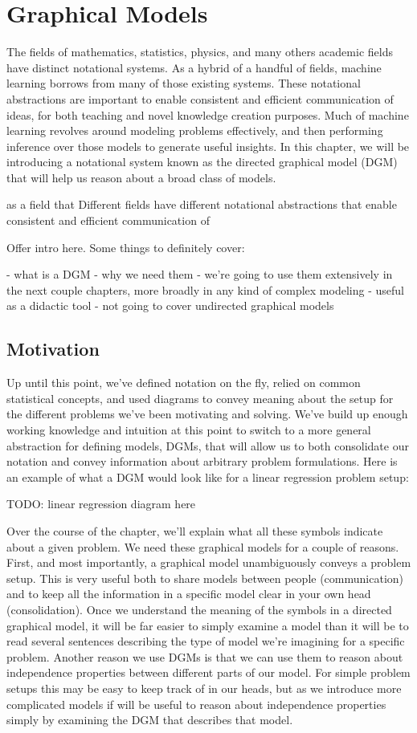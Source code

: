 \chapter{Graphical Models}
The fields of mathematics, statistics, physics, and many others academic fields have distinct notational systems. As a hybrid of a handful of fields, machine learning borrows from many of those existing systems. These notational abstractions are important to enable consistent and efficient communication of ideas, for both teaching and novel knowledge creation purposes. Much of machine learning revolves around modeling problems effectively, and then performing inference over those models to generate useful insights. In this chapter, we will be introducing a notational system known as the directed graphical model (DGM) that will help us reason about a broad class of models.

 as a field that Different fields have different notational abstractions that enable consistent and efficient communication of 

Offer intro here. Some things to definitely cover:

- what is a DGM
- why we need them
- we're going to use them extensively in the next couple chapters, more broadly in any kind of complex modeling
- useful as a didactic tool
- not going to cover undirected graphical models

\section{Motivation}
Up until this point, we've defined notation on the fly, relied on common statistical concepts, and used diagrams to convey meaning about the setup for the different problems we've been motivating and solving. We've build up enough working knowledge and intuition at this point to switch to a more general abstraction for defining models, DGMs, that will allow us to both consolidate our notation and convey information about arbitrary problem formulations. Here is an example of what a DGM would look like for a linear regression problem setup:

TODO: linear regression diagram here

Over the course of the chapter, we'll explain what all these symbols indicate about a given problem. We need these graphical models for a couple of reasons. First, and most importantly, a graphical model unambiguously conveys a problem setup. This is very useful both to share models between people (communication) and to keep all the information in a specific model clear in your own head (consolidation). Once we understand the meaning of the symbols in a directed graphical model, it will be far easier to simply examine a model than it will be to read several sentences describing the type of model we're imagining for a specific problem. Another reason we use DGMs is that we can use them to reason about independence properties between different parts of our model. For simple problem setups this may be easy to keep track of in our heads, but as we introduce more complicated models if will be useful to reason about independence properties simply by examining the DGM that describes that model.

